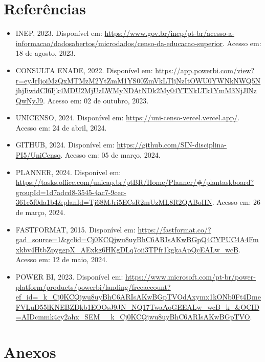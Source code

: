 \documentclass[a4paper,12pt]{article}
\begin{document}
\section{Referências}
\begin{itemize}
    \item INEP, 2023. Disponível em: \url{https://www.gov.br/inep/pt-br/acesso-a-informacao/dadosabertos/microdados/censo-da-educacao-superior}. Acesso em: 18 de agosto, 2023.
    \item CONSULTA ENADE, 2022. Disponível em: \url{https://app.powerbi.com/view?r=eyJrIjoiMzQxMTMzM2YtZmM1YS00ZmVkLTljNzItOWU0YWNkNWQ5NjhjIiwidCI6Ijk4MDU2MjUzLWMyNDAtNDk2My04YTNkLTk1YmM3NjJlNzQwNyJ9}. Acesso em: 02 de outubro, 2023.
    \item UNICENSO, 2024. Disponível em: \url{https://uni-censo-vercel.vercel.app/}. Acesso em: 24 de abril, 2024.
    \item GITHUB, 2024. Disponível em: \url{https://github.com/SIN-disciplina-PI5/UniCenso}. Acesso em: 05 de março, 2024.
    \item PLANNER, 2024. Disponível em: \url{https://tasks.office.com/unicap.br/ptBR/Home/Planner/#/plantaskboard?groupId=1d7adcd8-3545-4ac7-9cec-361e5f0da1b4&planId=Tj68MJri5ECsR2mUzML8R2QABoHN}. Acesso em: 26 de março, 2024.
    \item FASTFORMAT, 2015. Disponível em: \url{https://fastformat.co/?gad_source=1&gclid=Cj0KCQjwu8uyBhC6ARIsAKwBGpQ4CYPUC4A4Fmxkbv4HtbZpyggpX_AExkg6HKgDLq7oii3TPfr1kgkaApQcEALw_wcB}. Acesso em: 12 de maio, 2024.
    \item POWER BI, 2023. Disponível em: \url{https://www.microsoft.com/pt-br/power-platform/products/powerbi/landing/freeaccount?ef_id=_k_Cj0KCQjwu8uyBhC6ARIsAKwBGpTVOdAxymx1kONb0Ft4DmeFVLuD55lKNEBZDkb1EOOsJ9JN_NQ17TwaAoGEEALw_wcB_k_&OCID=AIDcmmk4cy2ahx_SEM__k_Cj0KCQjwu8uyBhC6ARIsAKwBGpTVO}.
\end{itemize}

\section{Anexos}
\end{document}
